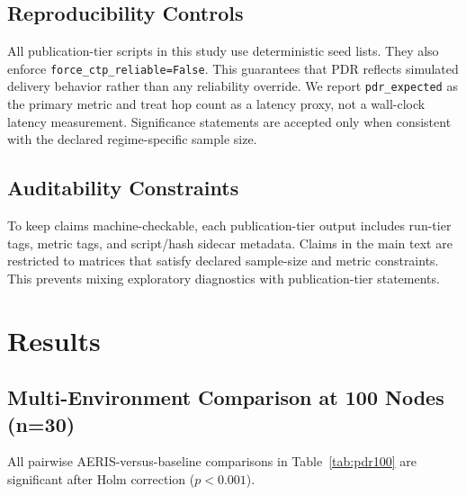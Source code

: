 ﻿\documentclass[sensors,article,submit,moreauthors,pdftex]{Definitions/mdpi}
\begin{document}
\subsection{Reproducibility Controls}
All publication-tier scripts in this study use deterministic seed lists. They also enforce \texttt{force\_ctp\_reliable=False}. This guarantees that PDR reflects simulated delivery behavior rather than any reliability override. We report \texttt{pdr\_expected} as the primary metric and treat hop count as a latency proxy, not a wall-clock latency measurement. Significance statements are accepted only when consistent with the declared regime-specific sample size.

\subsection{Auditability Constraints}
To keep claims machine-checkable, each publication-tier output includes run-tier tags, metric tags, and script/hash sidecar metadata. Claims in the main text are restricted to matrices that satisfy declared sample-size and metric constraints. This prevents mixing exploratory diagnostics with publication-tier statements.

\section{Results}
\subsection{Multi-Environment Comparison at 100 Nodes (n=30)}
\begin{table}[H]
\caption{PDR by environment at 100 nodes from the legacy 100-node matrix (n=30 per environment-protocol cell; strict collision/relay flags disabled). Standard deviations are reported as stored in the source result file.}
\label{tab:pdr100}
\centering
{}
\end{table}
All pairwise AERIS-versus-baseline comparisons in Table~\ref{tab:pdr100} are significant after Holm correction ($p<0.001$).
\end{document}
